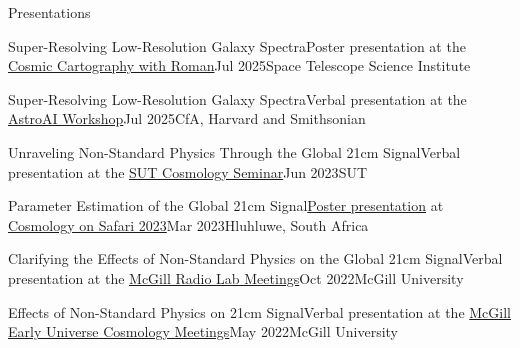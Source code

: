\documentclass[]{kyvernitis-resume}
\begin{document}
\begin{section}{Presentations}
\begin{subsectionnobullet}{Super-Resolving Low-Resolution Galaxy Spectra}{Poster presentation at the \href{https://www.stsci.edu/files/live/sites/www/files/home/events/event-assets/2025/_documents/2025-Roman-Symposium-Schedule.pdf}{Cosmic Cartography with Roman}}{Jul 2025}{Space Telescope Science Institute}
\end{subsectionnobullet}

\begin{subsectionnobullet}{Super-Resolving Low-Resolution Galaxy Spectra}{Verbal presentation at the \href{https://astroai.cfa.harvard.edu/workshop/details.html}{AstroAI Workshop}}{Jul 2025}{CfA, Harvard and Smithsonian}
\end{subsectionnobullet}

\begin{subsectionnobullet}{Unraveling Non-Standard Physics Through the Global 21cm Signal}{Verbal presentation at the \href{https://physics.sharif.edu/~cosmology/?p=2495}{SUT Cosmology Seminar}}{Jun 2023}{SUT}
\end{subsectionnobullet}

\begin{subsectionnobullet}{Parameter Estimation of the Global 21cm Signal}{\href{https://github.com/aryana-haghjoo/My-Project/blob/main/presentations/poster/poster.pdf}{Poster presentation} at \href{https://cosmosafari.co.za/}{Cosmology on Safari 2023}}{Mar 2023}{Hluhluwe, South Africa}
\end{subsectionnobullet}

\begin{subsectionnobullet}{Clarifying the Effects of Non-Standard Physics on the Global 21cm Signal}{Verbal presentation at the \href{https://www.physics.mcgill.ca/~chiang/}{McGill Radio Lab Meetings}}{Oct 2022}{McGill University}
\end{subsectionnobullet}

\begin{subsectionnobullet}{Effects of Non-Standard Physics on 21cm Signal}{Verbal presentation at the \href{https://www.physics.mcgill.ca/~rhb/}{McGill Early Universe Cosmology Meetings}}{May 2022}{McGill University}
\end{subsectionnobullet}

\end{section}
\end{document}
